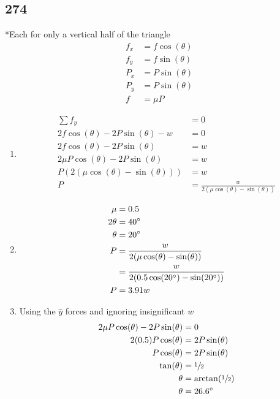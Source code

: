 \documentclass{article}
\begin{document}
\subsection{274}
*Each for only a vertical half of the triangle
\begin{align*}
	f_x & = f\cos(\theta) \\
	f_y & = f\sin(\theta) \\
	P_x & = P\sin(\theta) \\
	P_y & = P\sin(\theta) \\
	f & = \mu P
\end{align*}
\begin{enumerate}[label=\textbf{(\alph*)}]
	\item
		\begin{align*}
			\sum f_y & = 0 \\
			2f\cos(\theta) - 2P\sin(\theta) - w & = 0 \\
			2f\cos(\theta) - 2P\sin(\theta) & = w \\
			2\mu P\cos(\theta) - 2P\sin(\theta) & = w \\
			P \left( 2 ( \mu \cos(\theta) - \sin(\theta) ) \right) & = w \\
			P & = \frac{w}{2 ( \mu \cos(\theta) - \sin(\theta) )}
		\end{align*}
	\item
		\begin{align*}
			\mu & = 0.5 \\
			2\theta & = 40\degree \\
			\theta & = 20\degree \\
			P & = \frac{w}{2( \mu \cos(\theta) - \sin(\theta))} \\
			  & = \frac{w}{2( 0.5 \cos(20\degree) - \sin(20\degree) )} \\
			P & = 3.91w
		\end{align*}
	\item
		Using the $ \hat{y} $ forces and ignoring insignificant $ w $
		\begin{align*}
			2\mu P\cos(\theta) - 2P\sin(\theta) & = 0 \\
			2(0.5) P\cos(\theta) & = 2P\sin(\theta) \\
			P\cos(\theta) & = 2P\sin(\theta) \\
			\tan(\theta) & = \sfrac{1}{2} \\
			\theta & = \arctan(\sfrac{1}{2}) \\
			\theta & = 26.6\degree
		\end{align*}
		\bc{2\theta = 53.2\degree}
\end{enumerate}
\end{document}

